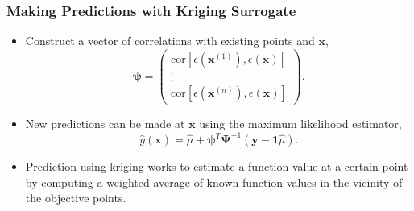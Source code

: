 \begin{frame}
\frametitle{Making Predictions with Kriging Surrogate}

\begin{itemize}
  \item Construct a vector of correlations with existing points and $\textbf{x}$,
   \begin{equation}
 	\boldsymbol{\psi} =
 	\begin{pmatrix} 
	 \text{cor} \left[ \epsilon\left( \textbf{x}^{(1)} \right) , \epsilon\left( \textbf{x} \right)  \right]  \\
	 \vdots \\ 
	 \text{cor} \left[ \epsilon\left( \textbf{x}^{(n)} \right) , \epsilon\left( \textbf{x} \right)  \right] 
    \end{pmatrix}. \nonumber
   \end{equation} 
  \item  New predictions can be made at $\textbf{x}$ using the maximum likelihood estimator,
   \begin{equation}
    \hat{y}(\textbf{x}) = \hat{\mu} + 
   	 \boldsymbol{\psi}^T\boldsymbol{\Psi}^{-1}
   	  \left(\textbf{y} - \textbf{1}\hat{\mu}\right). \nonumber
   \end{equation}
  \item Prediction using kriging works to estimate a function value at a certain point by computing a weighted average of known function values in the vicinity of the objective points.
\end{itemize}

\end{frame}